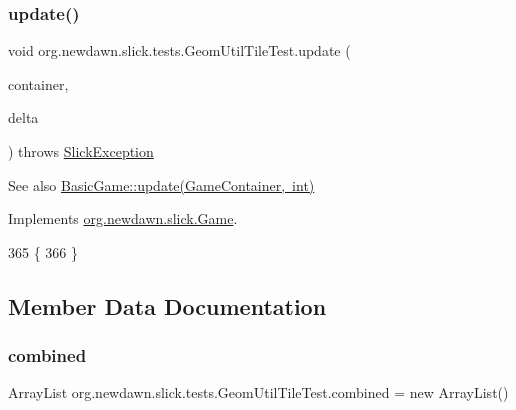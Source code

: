 \subsubsection{\texorpdfstring{update()}{update()}}
{\footnotesize\ttfamily void org.\+newdawn.\+slick.\+tests.\+Geom\+Util\+Tile\+Test.\+update (\begin{DoxyParamCaption}\item[{\mbox{\hyperlink{classorg_1_1newdawn_1_1slick_1_1_game_container}{Game\+Container}}}]{container,  }\item[{int}]{delta }\end{DoxyParamCaption}) throws \mbox{\hyperlink{classorg_1_1newdawn_1_1slick_1_1_slick_exception}{Slick\+Exception}}\hspace{0.3cm}{\ttfamily [inline]}}

\begin{DoxySeeAlso}{See also}
\mbox{\hyperlink{classorg_1_1newdawn_1_1slick_1_1_basic_game_acfe6fa05aef83bff1631af91a3e4bd20}{Basic\+Game\+::update(\+Game\+Container, int)}} 
\end{DoxySeeAlso}


Implements \mbox{\hyperlink{interfaceorg_1_1newdawn_1_1slick_1_1_game_ab07b2e9463ee4631620dde0de25bdee8}{org.\+newdawn.\+slick.\+Game}}.


\begin{DoxyCode}
365                                   \{
366     \}
\end{DoxyCode}


\subsection{Member Data Documentation}
\mbox{\label{classorg_1_1newdawn_1_1slick_1_1tests_1_1_geom_util_tile_test_af1dbc2f8a0c508f3632c7cb514b94582}} 
\subsubsection{\texorpdfstring{combined}{combined}}
{\footnotesize\ttfamily Array\+List org.\+newdawn.\+slick.\+tests.\+Geom\+Util\+Tile\+Test.\+combined = new Array\+List()\hspace{0.3cm}{\ttfamily [private]}}

